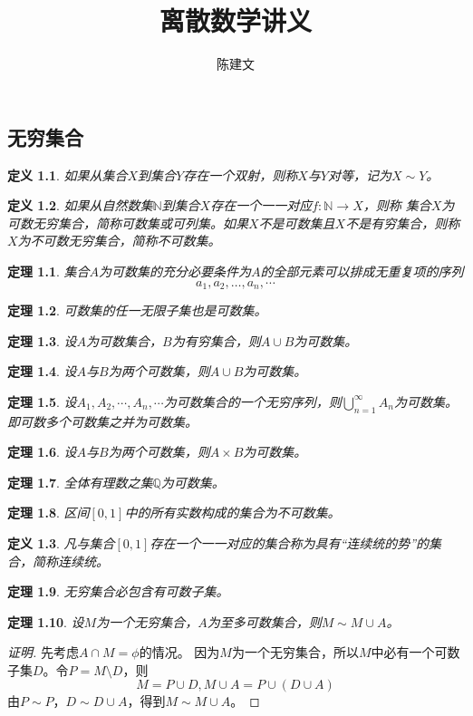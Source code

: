 \documentclass{book}[oneside]
\newtheorem{Def}{定义}[chapter]
\newtheorem{Thm}{定理}[chapter]
\begin{document}
\begin{CJK*}{UTF8}{gbsn}
  \title{离散数学讲义}
  \author{陈建文}
  \maketitle
  

  \setcounter{chapter}{3}
  \chapter{无穷集合}
  \begin{Def}
    如果从集合$X$到集合$Y$存在一个双射，则称$X$与$Y$对等，记为$X \sim Y$。
  \end{Def}
  \begin{Def}
    如果从自然数集$\mathbb{N}$到集合$X$存在一个一一对应$f:\mathbb{N}\to X$，则称
    集合$X$为可数无穷集合，简称可数集或可列集。如果$X$不是可数集且$X$不是有穷集合，则称$X$为不可数无穷集合，简称不可数集。
  \end{Def}
  \begin{Thm}
    集合$A$为可数集的充分必要条件为$A$的全部元素可以排成无重复项的序列
    \[a_1, a_2, \ldots, a_n, \cdots\]
  \end{Thm}
    \begin{Thm}
       可数集的任一无限子集也是可数集。
  \end{Thm}
  \begin{Thm}
   设$A$为可数集合，$B$为有穷集合，则$A\cup B$为可数集。
  \end{Thm}
  \begin{Thm}
    设$A$与$B$为两个可数集，则$A\cup B$为可数集。
  \end{Thm}

    \begin{Thm}
    设$A_1, A_2, \cdots, A_n, \cdots$为可数集合的一个无穷序列，则$\bigcup_{n=1}^{\infty}A_n$为可数集。即可数多个可数集之并为可数集。
  \end{Thm}
  \begin{Thm}
    设$A$与$B$为两个可数集，则$A\times B$为可数集。
  \end{Thm}
  \begin{Thm}
    全体有理数之集$\mathbb{Q}$为可数集。
  \end{Thm}
  \begin{Thm}
    区间$[0,1]$中的所有实数构成的集合为不可数集。
  \end{Thm}
  \begin{Def}
    凡与集合$[0,1]$存在一个一一对应的集合称为具有“连续统的势”的集合，简称连续统。
  \end{Def}
    \begin{Thm}
    无穷集合必包含有可数子集。
  \end{Thm}
  \begin{Thm}
    设$M$为一个无穷集合，$A$为至多可数集合，则$M \sim M \cup A$。
  \end{Thm}
  \begin{proof}[证明]
    先考虑$A\cap M=\phi$的情况。
    因为$M$为一个无穷集合，所以$M$中必有一个可数子集$D$。令$P=M\setminus D$，则
    \[M=P\cup D, M\cup A = P\cup (D\cup A)\]
    由$P\sim P$，$D\sim D\cup A$，得到$M\sim M\cup A$。


\end{proof}
\end{CJK*}
\end{document}

